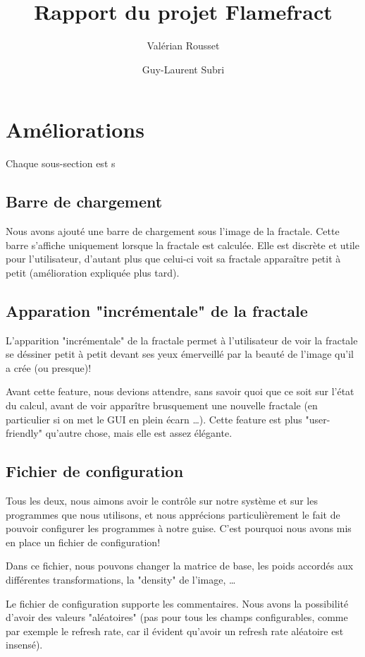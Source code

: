\documentclass[a4paper]{article}
\author{Valérian Rousset \and Guy-Laurent Subri}
\title{Rapport du projet Flamefract}
\begin{document}
\maketitle

\section*{Améliorations}
Chaque sous-section est s

\subsection*{Barre de chargement}
Nous avons ajouté une barre de chargement sous l'image de la fractale. Cette barre s'affiche uniquement lorsque la fractale est calculée. Elle est discrète et utile pour l'utilisateur, d'autant plus que celui-ci voit sa fractale apparaître petit à petit (amélioration expliquée plus tard).

\subsection*{Apparation "incrémentale" de la fractale}
L'apparition "incrémentale" de la fractale permet à l'utilisateur de voir la fractale se déssiner petit à petit devant ses yeux émerveillé par la beauté de l'image qu'il a crée (ou presque)!

Avant cette feature, nous devions attendre, sans savoir quoi que ce soit sur l'état du calcul, avant de voir apparître brusquement une nouvelle fractale (en particulier si on met le GUI en plein écarn \ldots). Cette feature est plus "user-friendly" qu'autre chose, mais elle est assez élégante.

\subsection*{Fichier de configuration}
Tous les deux, nous aimons avoir le contrôle sur notre système et sur les programmes que nous utilisons, et nous apprécions particulièrement le fait de pouvoir configurer les programmes à notre guise. C'est pourquoi nous avons mis en place un fichier de configuration!

Dans ce fichier, nous pouvons changer la matrice de base, les poids accordés aux différentes transformations, la "density" de l'image, \ldots

Le fichier de configuration supporte les commentaires. Nous avons la possibilité d'avoir des valeurs "aléatoires" (pas pour tous les champs configurables, comme par exemple le refresh rate, car il évident qu'avoir un refresh rate aléatoire est insensé).
\end{document}
